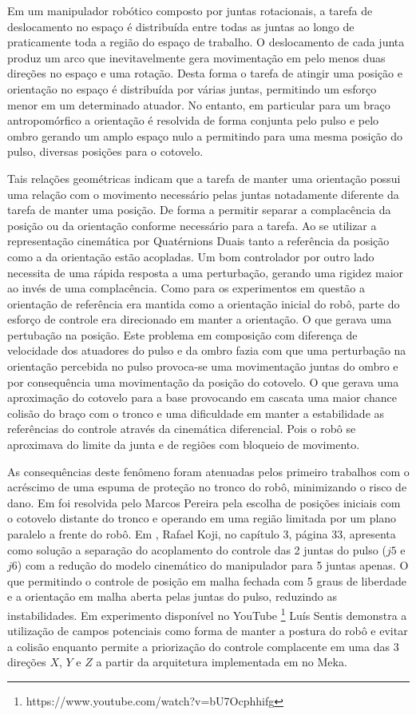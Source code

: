 Em um manipulador robótico composto por juntas rotacionais, a tarefa de deslocamento no espaço é distribuída entre todas as juntas ao longo de praticamente toda a região do espaço de trabalho. O deslocamento de cada junta produz um arco que inevitavelmente gera movimentação em pelo menos duas direções no espaço e uma rotação. Desta forma o tarefa de atingir uma posição e orientação no espaço é distribuída por várias juntas, permitindo um esforço menor em um determinado atuador. No entanto, em particular para um braço antropomórfico a orientação é resolvida de forma conjunta pelo pulso e pelo ombro gerando um amplo espaço nulo a permitindo para uma mesma posição do pulso, diversas posições para o cotovelo.

Tais relações geométricas indicam que a tarefa de manter uma orientação possui uma relação com o movimento necessário pelas juntas notadamente diferente da tarefa de manter uma posição. De forma a permitir separar a complacência da posição ou da orientação conforme necessário para a tarefa. Ao se utilizar a representação cinemática por Quatérnions Duais tanto a referência da posição como a da orientação estão acopladas. Um bom controlador por outro lado necessita de uma rápida resposta a uma perturbação, gerando uma rigidez maior ao invés de uma complacência. Como para os experimentos em questão a orientação de referência era mantida como a orientação inicial do robô, parte do esforço de controle era direcionado em manter a orientação. O que gerava uma pertubação na posição. Este problema em composição com diferença de velocidade dos atuadores do pulso e da ombro fazia com que uma perturbação na orientação percebida no pulso provoca-se uma movimentação juntas do ombro e por consequência uma movimentação da posição do cotovelo. O que gerava uma aproximação do cotovelo para a base provocando em cascata uma maior chance colisão do braço com o tronco e uma dificuldade em manter a estabilidade as referências do controle através da cinemática diferencial. Pois o robô se aproximava do limite da junta e de regiões com bloqueio de movimento.

As consequências deste fenômeno foram atenuadas pelos primeiro trabalhos com o acréscimo de uma espuma de proteção no tronco do robô, minimizando o risco de dano. Em \cite{marcosps2016} foi resolvida pelo Marcos Pereira pela escolha de posições iniciais com o cotovelo distante do tronco e operando em uma região limitada por um plano paralelo a frente do robô. Em \cite{koji2017}, Rafael Koji, no capítulo 3, página 33, apresenta como solução a separação do acoplamento do controle das 2 juntas do pulso ($j5$ e $j6$) com a redução do modelo cinemático do manipulador para 5 juntas apenas. O que permitindo o controle de posição em malha fechada com 5 graus de liberdade e a orientação em malha aberta pelas juntas do pulso, reduzindo as instabilidades. Em experimento disponível no YouTube \footnote{https://www.youtube.com/watch?v=bU7Ocphhifg} Luís Sentis demonstra a utilização de campos potenciais como forma de manter a postura do robô e evitar a colisão enquanto permite a priorização do controle complacente em uma das 3 direções $X$, $Y$ e $Z$ a partir da arquitetura implementada em \cite{sentis2007synthesis} no Meka.

